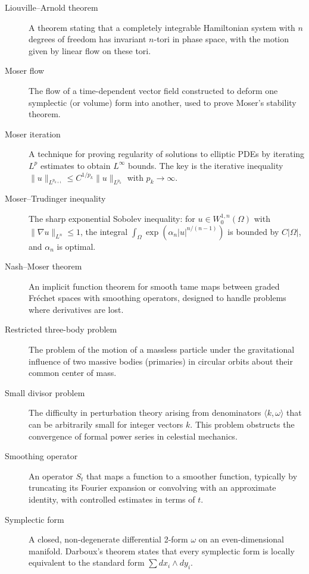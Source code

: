 \begin{description}
\item[Liouville--Arnold theorem] A theorem stating that a completely integrable Hamiltonian system with $n$ degrees of freedom has invariant $n$-tori in phase space, with the motion given by linear flow on these tori.

\item[Moser flow] The flow of a time-dependent vector field constructed to deform one symplectic (or volume) form into another, used to prove Moser's stability theorem.

\item[Moser iteration] A technique for proving regularity of solutions to elliptic PDEs by iterating $L^p$ estimates to obtain $L^\infty$ bounds. The key is the iterative inequality $\|u\|_{L^{p_{k+1}}} \leq C^{1/p_k} \|u\|_{L^{p_k}}$ with $p_k \to \infty$.

\item[Moser--Trudinger inequality] The sharp exponential Sobolev inequality: for $u \in W^{1,n}_0(\Omega)$ with $\|\nabla u\|_{L^n} \leq 1$, the integral $\int_\Omega \exp(\alpha_n |u|^{n/(n-1)})$ is bounded by $C|\Omega|$, and $\alpha_n$ is optimal.

\item[Nash--Moser theorem] An implicit function theorem for smooth tame maps between graded Fr\'echet spaces with smoothing operators, designed to handle problems where derivatives are lost.

\item[Restricted three-body problem] The problem of the motion of a massless particle under the gravitational influence of two massive bodies (primaries) in circular orbits about their common center of mass.

\item[Small divisor problem] The difficulty in perturbation theory arising from denominators $\langle k, \omega \rangle$ that can be arbitrarily small for integer vectors $k$. This problem obstructs the convergence of formal power series in celestial mechanics.

\item[Smoothing operator] An operator $S_t$ that maps a function to a smoother function, typically by truncating its Fourier expansion or convolving with an approximate identity, with controlled estimates in terms of $t$.

\item[Symplectic form] A closed, non-degenerate differential 2-form $\omega$ on an even-dimensional manifold. Darboux's theorem states that every symplectic form is locally equivalent to the standard form $\sum dx_i \wedge dy_i$.


\end{description}
